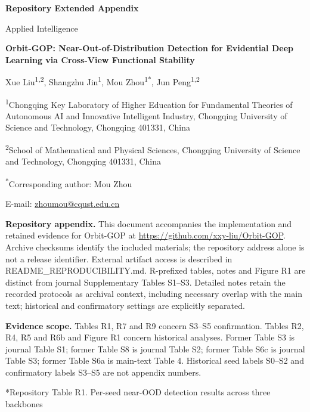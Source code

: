 \documentclass[11pt,a4paper]{article}
\makeatletter
\renewcommand\section{\@startsection{section}{1}{\z@}{-2.2ex plus -.8ex minus -.2ex}{1ex plus .2ex}{\normalfont\large\bfseries\raggedright}}
\makeatother
\begin{document}
\begin{center}
{\Large\bfseries Repository Extended Appendix\par}
{\normalfont\fontsize{12}{14}\selectfont Applied Intelligence\par}
\medskip
{\large\bfseries Orbit-GOP: Near-Out-of-Distribution Detection for Evidential Deep Learning via Cross-View Functional Stability\par}
\medskip
{\normalsize Xue Liu\textsuperscript{1,2}, Shangzhu Jin\textsuperscript{1}, Mou Zhou\textsuperscript{1*}, Jun Peng\textsuperscript{1,2}\par}
{\normalsize \textsuperscript{1}Chongqing Key Laboratory of Higher Education for Fundamental Theories of Autonomous AI and Innovative Intelligent Industry, Chongqing University of Science and Technology, Chongqing 401331, China\par}
{\normalsize \textsuperscript{2}School of Mathematical and Physical Sciences, Chongqing University of Science and Technology, Chongqing 401331, China\par}
{\normalsize \textsuperscript{*}Corresponding author: Mou Zhou\par}
{\normalsize E-mail: \href{mailto:zhoumou@cqust.edu.cn}{zhoumou@cqust.edu.cn}\par}
\end{center}

\noindent\textbf{Repository appendix.} This document accompanies the implementation and retained evidence for Orbit-GOP at \url{https://github.com/xxy-liu/Orbit-GOP}. Archive checksums identify the included materials; the repository address alone is not a release identifier. External artifact access is described in README\_REPRODUCIBILITY.md. R-prefixed tables, notes and Figure R1 are distinct from journal Supplementary Tables S1--S3. Detailed notes retain the recorded protocols as archival context, including necessary overlap with the main text; historical and confirmatory settings are explicitly separated.

\noindent\textbf{Evidence scope.} Tables R1, R7 and R9 concern S3--S5 confirmation. Tables R2, R4, R5 and R6b and Figure R1 concern historical analyses. Former Table S3 is journal Table S1; former Table S8 is journal Table S2; former Table S6c is journal Table S3; former Table S6a is main-text Table 4. Historical seed labels S0--S2 and confirmatory labels S3--S5 are not appendix numbers.

\section*{Repository Table R1. Per-seed near-OOD detection results across three backbones}\label{supplementary-table-s1.-per-seed-near-ood-detection-results-across-three-backbones}
\end{document}
